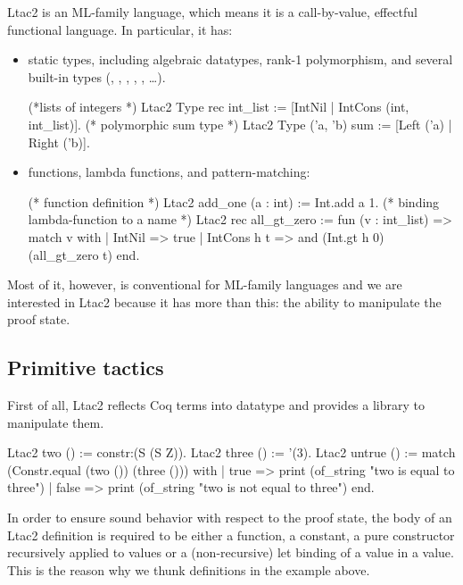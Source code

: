 Ltac2 is an ML-family language, which means it is a call-by-value, effectful functional language.
In particular, it has:
\begin{itemize}
\item static types, including algebraic datatypes, rank-1 polymorphism, and several built-in types (, , , , , \ldots).
  \begin{coq}
  (*lists of integers *)
  Ltac2 Type rec int_list := [IntNil | IntCons (int, int_list)].
  (* polymorphic sum type *)
  Ltac2 Type ('a, 'b) sum := [Left ('a) | Right ('b)].
  \end{coq}
\item functions, lambda functions, and pattern-matching:
  \begin{coq}
  (* function definition *)
  Ltac2 add_one (a : int) := Int.add a 1.
  (* binding lambda-function to a name *)
  Ltac2 rec all_gt_zero := fun (v : int_list) =>
    match v with
    | IntNil => true
    | IntCons h t => and (Int.gt h 0) (all_gt_zero t)
    end.
  \end{coq}
\end{itemize}

Most of it, however, is conventional for ML-family languages and  we are interested in Ltac2 because it has more than this: the ability to manipulate the proof state.

\subsection{Primitive tactics}
\label{sec:primitive-tactics}

First of all, Ltac2 reflects Coq terms into  datatype and provides a library to manipulate them.

\begin{coq}
Ltac2 two () := constr:(S (S Z)).
Ltac2 three () := '(3).
Ltac2 untrue () := match (Constr.equal (two ()) (three ())) with
  | true => print (of_string "two is equal to three")
  | false => print (of_string "two is not equal to three")
  end.
\end{coq}

In order to ensure sound behavior with respect to the proof state, the body of an Ltac2 definition is required to be either a function, a constant, a pure constructor recursively applied to values or a (non-recursive) let binding of a value in a value.
This is the reason why we thunk definitions in the example above.

